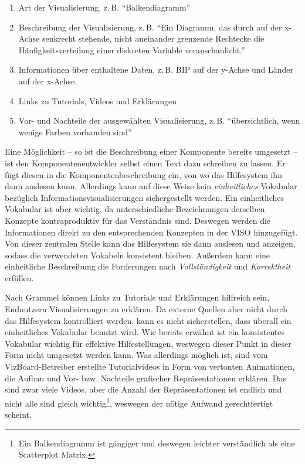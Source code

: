 \documentclass[
	headsepline,
	footsepline,
	fontsize=12pt,
	bibliography=totoc
]{scrbook}
\begin{document}

\begin{enumerate}
	\item Art der Visualisierung, z.\,B. \enquote{Balkendiagramm}
	\item Beschreibung der Visualisierung, z.\,B. \enquote{Ein Diagramm, das durch auf der x-Achse senkrecht stehende, nicht aneinander grenzende Rechtecke die Häufigkeitsverteilung einer diskreten Variable veranschaulicht.}
	\item Informationen über enthaltene Daten, z.\,B. BIP auf der y-Achse und Länder auf der x-Achse.
	\item Links zu Tutorials, Videos und Erklärungen
	\item Vor- und Nachteile der ausgewählten Visualisierung, z.\,B. \enquote{übersichtlich, wenn wenige Farben vorhanden sind}
\end{enumerate}

Eine Möglichkeit -- so ist die Beschreibung einer Komponente bereits umgesetzt -- ist den Komponentenentwickler selbst einen Text dazu schreiben zu lassen. Er fügt diesen in die Komponentenbeschreibung ein, von wo das Hilfesystem ihn dann auslesen kann. Allerdings kann auf diese Weise kein \emph{einheitliches} Vokabular bezüglich Informationsvisualisierungen sichergestellt werden. Ein einheitliches Vokabular ist aber wichtig, da unterschiedliche Bezeichnungen derselben Konzepte kontraproduktiv für das Verständnis sind. Deswegen werden die Informationen direkt zu den entsprechenden Konzepten in der VISO hinzugefügt. Von dieser zentralen Stelle kann das Hilfesystem sie dann auslesen und anzeigen, sodass die verwendeten Vokabeln konsistent bleiben. Außerdem kann eine einheitliche Beschreibung die Forderungen nach \emph{Vollständigkeit} und \emph{Korrektheit} erfüllen.


Nach Grammel \cite{Grammel2012} können Links zu Tutorials und Erklärungen hilfreich sein, Endnutzern Visualisierungen zu erklären. Da externe Quellen aber nicht durch das Hilfesystem kontrolliert werden, kann es nicht sicherstellen, dass überall ein einheitliches Vokabular benutzt wird. Wie bereits erwähnt ist ein konsistentes Vokabular wichtig für effektive Hilfestellungen, weswegen dieser Punkt in dieser Form nicht umgesetzt werden kann. Was allerdings möglich ist, sind vom VizBoard-Betreiber erstellte Tutorialvideos in Form von vertonten Animationen, die Aufbau und Vor- bzw. Nachteile grafischer Repräsentationen erklären. Das sind zwar viele Videos, aber die Anzahl der Repräsentationen ist endlich und nicht alle sind gleich wichtig\footnote{Ein Balkendiagramm ist gängiger und deswegen leichter verständlich als eine Scatterplot Matrix.}, weswegen der nötige Aufwand gerechtfertigt scheint.
\end{document}
